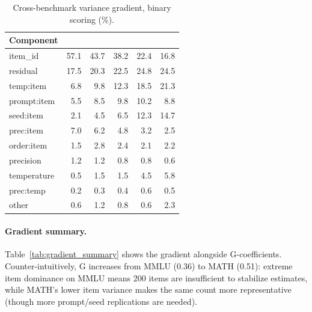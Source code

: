 \documentclass[11pt,twocolumn]{article}
\begin{document}
\begin{table}[t]
\centering
\caption{Cross-benchmark variance gradient, binary scoring (\%).}
\label{tab:gradient}
\small
\begin{tabular}{lRRRRR}
\toprule
Component &  &  &  &  &  \\
\midrule
item\_id & 57.1 & 43.7 & 38.2 & 22.4 & 16.8 \\
residual & 17.5 & 20.3 & 22.5 & 24.8 & 24.5 \\
temp:item & 6.8 & 9.8 & 12.3 & 18.5 & 21.3 \\
prompt:item & 5.5 & 8.5 & 9.8 & 10.2 & 8.8 \\
seed:item & 2.1 & 4.5 & 6.5 & 12.3 & 14.7 \\
prec:item & 7.0 & 6.2 & 4.8 & 3.2 & 2.5 \\
order:item & 1.5 & 2.8 & 2.4 & 2.1 & 2.2 \\
precision & 1.2 & 1.2 & 0.8 & 0.8 & 0.6 \\
temperature & 0.5 & 1.5 & 1.5 & 4.5 & 5.8 \\
prec:temp & 0.2 & 0.3 & 0.4 & 0.6 & 0.5 \\
other & 0.6 & 1.2 & 0.8 & 0.6 & 2.3 \\
\bottomrule
\end{tabular}
\end{table}

\paragraph{Gradient summary.}
Table~\ref{tab:gradient_summary} shows the gradient alongside G-coefficients.
Counter-intuitively, G increases from MMLU (0.36) to MATH (0.51): extreme item dominance on MMLU means 200 items are insufficient to stabilize estimates, while MATH's lower item variance makes the same count more representative (though more prompt/seed replications are needed).
\end{document}
